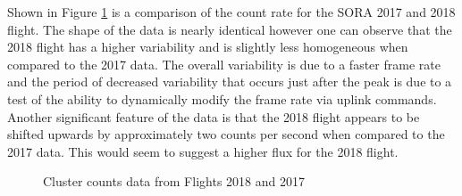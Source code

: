 Shown in Figure \ref{counts} is a comparison of the count rate for the SORA 2017 and 2018 flight. The shape of the data is nearly identical however one can observe that the 2018 flight has a higher variability and is slightly less homogeneous when compared to the 2017 data. The overall variability is due to a faster frame rate and the period of decreased variability that occurs just after the peak is due to a test of the ability to dynamically modify the frame rate via uplink commands. Another significant feature of the data is that the 2018 flight appears to be shifted upwards by approximately two counts per second when compared to the 2017 data. This would seem to suggest a higher flux for the 2018 flight.
\begin{figure}[H]
\hfill
{}
\hfill
{}
\hfill
\caption{Cluster counts data from Flights 2018 and 2017}
\label{counts}
\end{figure}

